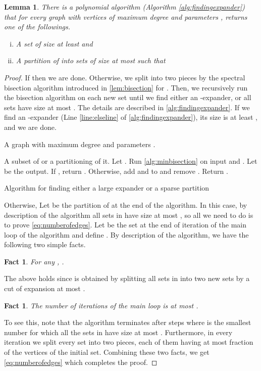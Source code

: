 \documentclass[11pt]{article}
\newcommand{\Input}{\item[{\bf Input:}]}
\newcommand{\Output}{\item[{\bf Output:}]}
\newtheorem{lemma}{Lemma}[section]
\newtheorem{fact}[theorem]{Fact}
\begin{document}
\begin{lemma}
\label{lem:graphdecomposition}
There is a 
polynomial algorithm (Algorithm \ref{alg:findingexpander}) that for every graph  with  vertices of maximum degree  and parameters , returns one of the followings. 
\begin{enumerate}[i)]
\item \label{case:largeexpander} A set  of size at least 
 and  
\item \label{case:decomposition} A
partition  of  into sets of size at most  such that  

\end{enumerate}

\end{lemma}
\begin{proof}
If   then we are done. Otherwise, we split 
 into two pieces by the spectral bisection algorithm introduced in \autoref{lem:bisection} for . Then, we recursively run the bisection algorithm  
on each new set until we find either an -expander, or all sets have size at most . The details are described in  \autoref{alg:findingexpander}. If we find an -expander (Line \ref{line:elseline} of  \autoref{alg:findingexpander}),  its size is at least , and we are done. 

\begin{algorithm}
\begin{algorithmic}[1]
	\Input A graph  with maximum degree  and parameters .
	\Output A subset of  or a partitioning of it. 
	\State Let . 
	        \State Run \autoref{alg:minbisection} on input  and . Let  be the output.
	        \State If , return .
	        Otherwise, add  and  to  and remove . \label{line:elseline}
		    \EndFor
	\EndWhile	
		\State Return .\label{line:nonexpanding}
\end{algorithmic}
\caption{Algorithm for finding either a large expander or a sparse partition}
\label{alg:findingexpander}
\end{algorithm}
Otherwise, Let  be the partition of  at the end of the algorithm. 
In this case, by description of the  algorithm all sets in  have size at most , so all we need to do is to prove \eqref{eq:numberofedges}.
Let  be the set  at the end of iteration  of the main 
loop of the algorithm and define .    
By  description of the algorithm, we have the following two simple facts.
\begin{fact}
For any , . 
\end{fact}
The above holds since  is obtained by splitting all sets in  into two new sets by a cut of expansion at most .
\begin{fact}
The number of iterations of the main loop is at most .
\end{fact}
To see this, note that the algorithm terminates after  steps where  is the smallest number for which all the sets in  have size at most . Furthermore, in every iteration we split every set into two pieces, each of them having at most  fraction of the vertices of the initial set. 
Combining these two facts, we get \eqref{eq:numberofedges} which completes the proof. 
\end{proof}
\end{document}
